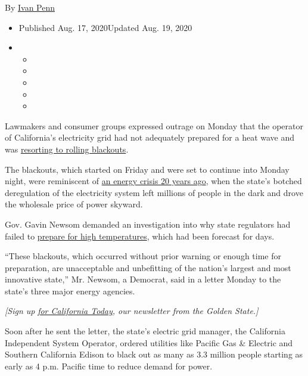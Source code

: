 By \href{https://www.nytimes3xbfgragh.onion/by/ivan-penn}{Ivan Penn}

\begin{itemize}
\item
  Published Aug. 17, 2020Updated Aug. 19, 2020
\item
  \begin{itemize}
  \item
  \item
  \item
  \item
  \item
  \end{itemize}
\end{itemize}

Lawmakers and consumer groups expressed outrage on Monday that the
operator of California's electricity grid had not adequately prepared
for a heat wave and was
\href{https://www.nytimes3xbfgragh.onion/2020/08/16/business/california-blackouts.html}{resorting
to rolling blackouts}.

The blackouts, which started on Friday and were set to continue into
Monday night, were reminiscent of
\href{https://www.nytimes3xbfgragh.onion/2002/09/18/us/california-power-failures-linked-to-energy-companies.html}{an
energy crisis 20 years ago}, when the state's botched deregulation of
the electricity system left millions of people in the dark and drove the
wholesale price of power skyward.

Gov. Gavin Newsom demanded an investigation into why state regulators
had failed to
\href{https://www.nytimes3xbfgragh.onion/2020/08/15/us/california-heat-wave-blackout.html}{prepare
for high temperatures}, which had been forecast for days.

``These blackouts, which occurred without prior warning or enough time
for preparation, are unacceptable and unbefitting of the nation's
largest and most innovative state,'' Mr. Newsom, a Democrat, said in a
letter Monday to the state's three major energy agencies.

\emph{{[}Sign up}
\href{https://www.nytimes3xbfgragh.onion/newsletters/california-today}{\emph{for
California Today}}\emph{, our newsletter from the Golden State.{]}}

Soon after he sent the letter, the state's electric grid manager, the
California Independent System Operator, ordered utilities like Pacific
Gas \& Electric and Southern California Edison to black out as many as
3.3 million people starting as early as 4 p.m. Pacific time to reduce
demand for power.

